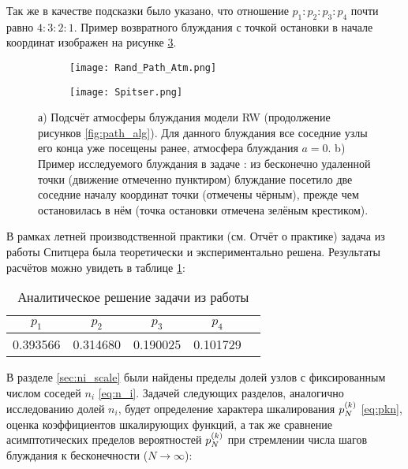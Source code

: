 Так же в качестве подсказки было указано, что отношение $p_1:p_2:p_3:p_4$ почти равно $4:3:2:1$.
Пример возвратного блуждания с точкой остановки в начале координат изображен на рисунке \ref{fig:path_spitser}. 

\begin{figure}[h]
    
\begin{subfigure}{0.5\textwidth}
    \texttt{[image: Rand\_Path\_Atm.png]}
    \caption{}
    \label{fig:path_atm}
\end{subfigure}
\hfill
\begin{subfigure}{0.5\textwidth}
    \texttt{[image: Spitser.png]}
    \caption{}
    \label{fig:path_spitser}
\end{subfigure}
\caption{а) Подсчёт атмосферы блуждания модели RW (продолжение рисунков \ref{fig:path_alg}). Для данного блуждания все соседние узлы его конца уже посещены ранее, атмосфера блуждания $a=0$. b) Пример исследуемого блуждания в задаче \cite{Spitser1969}: из бесконечно удаленной точки (движение отмеченно пунктиром) блуждание посетило две соседние началу координат точки (отмечены чёрным), прежде чем остановилась в нём (точка остановки отмечена зелёным крестиком).}
\end{figure}



В рамках летней производственной практики (см. Отчёт о практике) задача из работы Спитцера была теоретически и экспериментально решена. 
Результаты расчётов можно увидеть в таблице \ref{tab:Spitser_res}:

\begin{table}[h]
	\centering
	\begin{tabular}{|c|c|c|c|c|}
	\hline
	$p_1$ &  $p_2$ & $p_3$ &  $p_4$ \\ \hline
 	0.393566 & 0.314680 & 0.190025 & 0.101729 \\ \hline
	\end{tabular}
	\caption{Аналитическое решение задачи из работы  \cite{Spitser1969}}
	\label{tab:Spitser_res}
\end{table}

В разделе \ref{sec:ni_scale} были найдены пределы долей узлов с фиксированным числом соседей $n_i$ \eqref{eq:n_i}.
Задачей следующих разделов, аналогично исследованию долей $n_i$, будет определение характера шкалирования $p^{(k)}_N$ \eqref{eq:pkn}, оценка коэффициентов шкалирующих функций, а так же сравнение асимптотических пределов вероятностей $p^{(k)}_N$ при стремлении числа шагов блуждания к бесконечности ($N \to \infty$):

